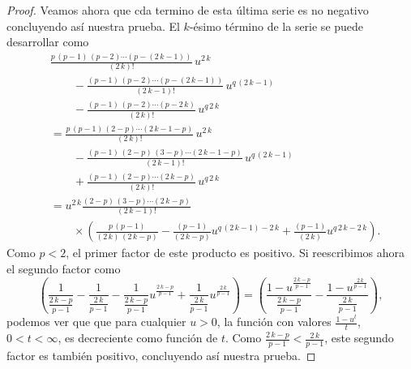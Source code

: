 \begin{proof}
    Veamos ahora que cda termino de esta última serie es no negativo concluyendo así nuestra prueba. El $ k $-ésimo término de la serie se puede desarrollar como
    \begin{align}
        &\frac{p\,(p-1)\,(p-2)\cdots(p-(2\,k-1))}{(2\,k)!}\,u^{2\,k} \\
        &\qquad - \frac{(p-1)\,(p-2)\cdots(p-(2\,k-1))}{(2\,k-1)!}\,u^{q\,(2\,k-1)} \\
        &\qquad - \frac{(p-1)\,(p-2)\cdots(p-2\,k)}{(2\,k)!}\,u^{q\,2\,k} \\
        &= \frac{p\,(p-1)\,(2-p)\cdots(2\,k-1-p)}{(2\,k)!}\,u^{2\,k} \\
        &\qquad - \frac{(p-1)\,(2-p)\,(3-p)\cdots(2\,k-1-p)}{(2\,k-1)!}\,u^{q\,(2\,k-1)} \\
        &\qquad + \frac{(p-1)\,(2-p)\cdots(2\,k-p)}{(2\,k)!}\,u^{q\,2\,k} \\
        &= u^{2\,k} \frac{(2-p)\,(3-p)\cdots(2\,k-p)}{(2\,k-1)!} \\
        &\qquad \times \left(\frac{p\,(p-1)}{(2\,k)\,(2\,k-p)} - \frac{(p-1)}{(2\,k-p)} u^{q\,(2\,k-1) - 2\,k} + \frac{(p-1)}{(2\,k)} u^{q\,2\,k - 2\,k}\right).
    \end{align}
    Como $ p < 2$, el primer factor de este producto es positivo. Si reescribimos ahora el segundo factor como 
    \begin{equation}
        \left(\frac{1}{\frac{2\,k-p}{p-1}} - \frac{1}{\frac{2\,k}{p-1}} - \frac{1}{\frac{2\,k-p}{p-1}} u^{\frac{2\,k-p}{p-1}} + \frac{1}{\frac{2\,k}{p-1}} u^{\frac{2\,k}{p-1}}\right)
        = \left(\frac{1 - u^{\frac{2\,k-p}{p-1}}}{\frac{2\,k-p}{p-1}} - \frac{1 - u^{\frac{2\,k}{p-1}}}{\frac{2\,k}{p-1}}\right),
    \end{equation}
    podemos ver que que para cualquier $ u > 0 $, la función con valores $ \frac{1-u^{t}}{t} $, $ 0 < t < \infty $, es decreciente como función de $ t $. Como $ \frac{2\,k-p}{p-1} < \frac{2\,k}{p-1} $, este segundo factor es también positivo, concluyendo así nuestra prueba.
\end{proof}

